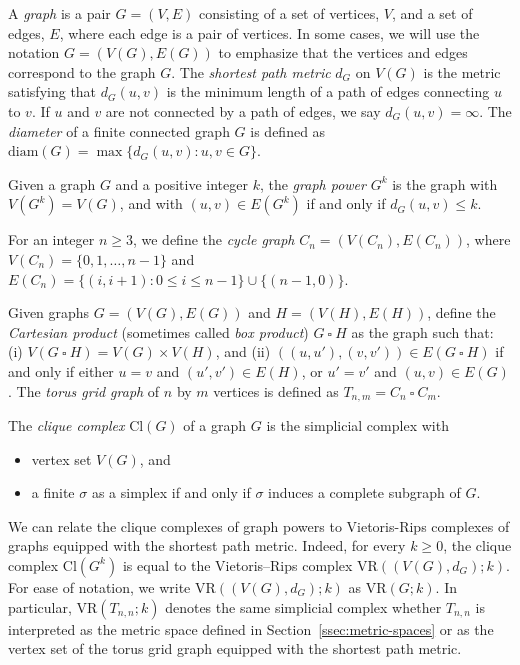 \documentclass[12pt,a4paper]{amsart}
\theoremstyle{definition}
\newcommand{\vr}[2]{\mathrm{VR}(#1;#2)}
\newcommand{\cl}{\ensuremath{\mathrm{Cl}}}
\newcommand{\diam}{\ensuremath{\mathrm{diam}}}
\numberwithin{equation}{section}
\begin{document}
A \emph{graph} is a pair $G = (V,E)$ consisting of a set of
vertices, $V$, and a set of edges, $E$, where each edge is a pair of vertices.
In some cases, we will use the notation $G = (V(G), E(G))$ to emphasize that the vertices and edges correspond to the graph $G$.
%
The \emph{shortest path metric} $d_G$ on $V(G)$ is the metric satisfying that $d_G(u,v)$ is the minimum length of a path of edges connecting $u$ to $v$.
If $u$ and $v$ are not connected by a path of edges, we say $d_G(u,v) = \infty$.
The \emph{diameter} of a finite connected graph $G$ is defined as $\diam(G) = \max \{ d_G(u,v) : u,v \in G\}$.

Given a graph $G$ and a positive integer $k$, the \emph{graph power} $G^k$ is the graph with $V(G^k) = V(G)$, and with $(u,v) \in E(G^k)$ if and only if $d_G(u,v) \leq k$.

For an integer $n\ge 3$, we define the \emph{cycle graph} $C_n = (V(C_n), E(C_n))$, where $V(C_n) = \{ 0, 1, \ldots, n-1 \}$ and $E(C_n) = \{ (i, i+1) : 0 \le i \le n-1 \} \cup \{ (n-1, 0)\}$.

Given graphs $G= (V(G), E(G))$ and $H=(V(H), E(H))$, define the \emph{Cartesian product} (sometimes called \emph{box product}) $G\ \square \ H$ as the graph such that: (i) $V(G \ \square \ H) = V(G) \times V(H)$, and (ii) $((u,u' ),(v,v')) \in E(G\ \square \ H)$ if and only if either $u = v$ and $(u',v') \in E(H)$, or $u' = v'$ and $(u,v)\in E(G)$.
The \emph{torus grid graph} of $n$ by $m$ vertices is defined as $T_{n,m} = C_n \ \square \ C_m$.

The \emph{clique complex} $\cl(G)$ of a graph $G$ is the simplicial complex with
\begin{itemize}
\item vertex set $V(G)$, and
\item a finite $\sigma$ as a simplex if and only if $\sigma$ induces a complete subgraph of $G$.
\end{itemize}

We can relate the clique complexes of graph powers to Vietoris-Rips complexes of graphs equipped with the shortest path metric.
Indeed, for every $k\ge 0$, the clique complex $\cl(G^k)$ is equal to the Vietoris--Rips complex $\vr{(V(G), d_G)}{k}$.
For ease of notation, we write $\vr{(V(G), d_G)}{k}$ as $\vr{G}{k}$.
In particular, $\vr{T_{n,n}}{k}$ denotes the same simplicial complex whether $T_{n,n}$ is interpreted as the metric space defined in Section~\ref{ssec:metric-spaces} or as the vertex set of the torus grid graph equipped with the shortest path metric.
\end{document}
